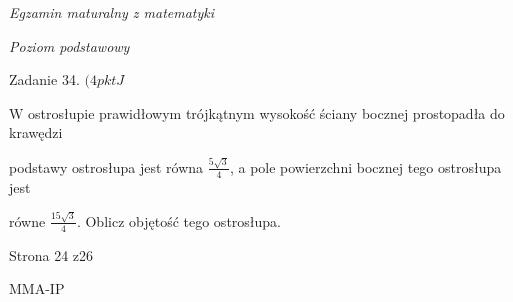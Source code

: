 \documentclass[a4paper,12pt]{article}
\begin{document}
{\it Egzamin maturalny z matematyki}

{\it Poziom podstawowy}

Zadanie 34. $(4pktJ$

$\mathrm{W}$ ostrosłupie prawidłowym trójkątnym wysokość ściany bocznej prostopadła do krawędzi

podstawy ostrosłupa jest równa $\displaystyle \frac{5\sqrt{3}}{4}$, a pole powierzchni bocznej tego ostrosłupa jest

równe $\displaystyle \frac{15\sqrt{3}}{4}$. Oblicz objętość tego ostrosłupa.

Strona 24 z26

MMA-IP
\end{document}
